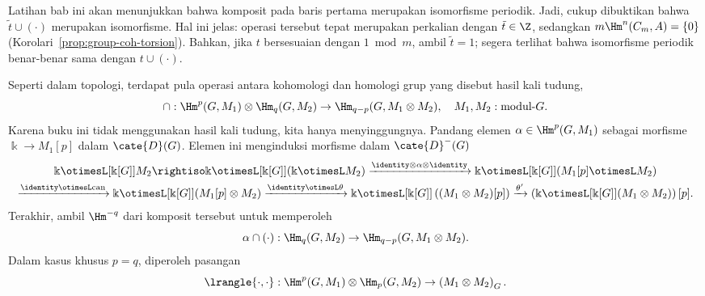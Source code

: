 \begin{contoh}
	Latihan bab ini akan menunjukkan bahwa komposit pada baris pertama merupakan
	isomorfisme periodik. Jadi, cukup dibuktikan bahwa
	$\tilde{t}\cup(\cdot)$ merupakan isomorfisme. Hal ini jelas: operasi tersebut
	tepat merupakan perkalian dengan $\tilde{t}\in\Z$, sedangkan
	$m\Hm^n(C_m,A)=\{0\}$
(Korolari~\ref{prop:group-coh-torsion}). Bahkan, jika $t$ bersesuaian dengan
$1\bmod m$, ambil $\tilde{t}=1$; segera terlihat bahwa isomorfisme periodik
benar-benar sama dengan $t\cup(\cdot)$.
\end{contoh}

\begin{catatan}\label{rem:cap-product}
	Seperti dalam topologi, terdapat pula operasi antara kohomologi dan homologi
	grup yang disebut hasil kali tudung,
	\[ \cap: \Hm^p(G, M_1) \otimes \Hm_q(G, M_2) \to \Hm_{q-p}(G, M_1 \otimes M_2), \quad M_1, M_2: \text{modul-$G$}. \]
	Karena buku ini tidak menggunakan hasil kali tudung, kita hanya
	menyinggungnya. Pandang elemen $\alpha\in\Hm^p(G,M_1)$ sebagai morfisme
	$\Bbbk\to M_1[p]$ dalam $\cate{D}(G)$. Elemen ini menginduksi morfisme dalam
	$\cate{D}^-(G)$
	\begin{multline*}
		\Bbbk \otimesL[{\Bbbk[G]}] M_2 \rightiso \Bbbk \otimesL[{\Bbbk[G]}] (\Bbbk \otimesL M_2) \xrightarrow{\identity \otimes \alpha \otimes \identity} \Bbbk \otimesL[{\Bbbk[G]}] (M_1[p] \otimesL M_2) \\
		\xrightarrow{\identity \otimesL \mathrm{can}} \Bbbk \otimesL[{\Bbbk[G]}] (M_1[p] \otimes M_2) \xrightarrow{\identity \otimesL \theta} \Bbbk \otimesL[{\Bbbk[G]}] \left( (M_1 \otimes M_2)[p] \right) \xrightarrow{\theta'} \left(\Bbbk \otimesL[{\Bbbk[G]}] (M_1 \otimes M_2)\right) [p].
	\end{multline*}
	Terakhir, ambil $\Hm^{-q}$ dari komposit tersebut untuk memperoleh
	\[ \alpha \cap (\cdot): \Hm_q(G, M_2) \to \Hm_{q-p}(G, M_1 \otimes M_2). \]
	Dalam kasus khusus $p=q$, diperoleh pasangan
	\[ \lrangle{\cdot, \cdot}: \Hm^p(G, M_1) \otimes \Hm_p(G, M_2) \to \left( M_1 \otimes M_2 \right)_G . \]
\end{catatan}
